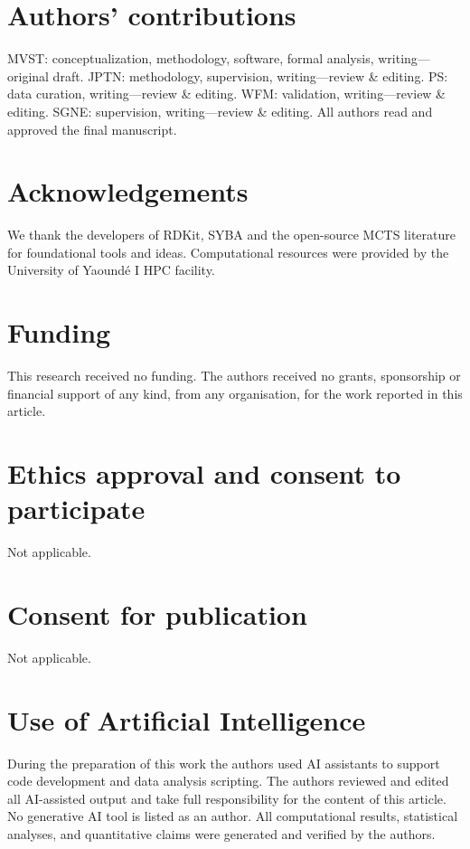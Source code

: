 \documentclass[10pt,a4paper]{article}
\begin{document}
\section*{Authors' contributions}
MVST: conceptualization, methodology, software, formal analysis, writing---original draft. JPTN: methodology, supervision, writing---review \& editing. PS: data curation, writing---review \& editing. WFM: validation, writing---review \& editing. SGNE: supervision, writing---review \& editing. All authors read and approved the final manuscript.

\section*{Acknowledgements}
We thank the developers of RDKit, SYBA and the open-source MCTS literature for foundational tools and ideas. Computational resources were provided by the University of Yaound\'{e} I HPC facility.

\section*{Funding}
This research received no funding. The authors received no grants, sponsorship or financial support of any kind, from any organisation, for the work reported in this article.

\section*{Ethics approval and consent to participate}
Not applicable.

\section*{Consent for publication}
Not applicable.

\section*{Use of Artificial Intelligence}
During the preparation of this work the authors used AI assistants to support code development and data analysis scripting. The authors reviewed and edited all AI-assisted output and take full responsibility for the content of this article. No generative AI tool is listed as an author. All computational results, statistical analyses, and quantitative claims were generated and verified by the authors.



\end{document}
